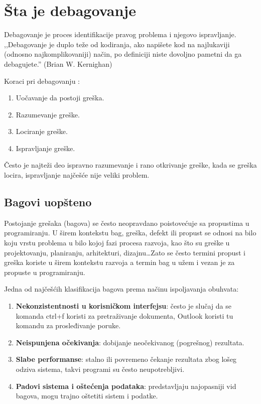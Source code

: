 \documentclass[a4paper]{article}
\begin{document}
\section{Šta je debagovanje}
\label{sec:sta je debagovanje}

Debagovanje je proces identifikacije pravog problema i njegovo ispravljanje.
,,Debagovanje je duplo teže od kodiranja, ako napišete kod na najlukaviji
(odnosno najkomplikovaniji) način, po definiciji niste dovoljno pametni da ga
debagujete.'' (Brian W. Kernighan) \cite{debagovanje_vladaf}


Koraci pri debagovanju \cite{bagovi_smalkov}:
\begin{enumerate}
\item Uočavanje da postoji greška.
\item Razumevanje greške.
\item Lociranje greške.
\item Ispravljanje greške.
\end{enumerate}

Često je najteži deo ispravno razumevanje i rano otkrivanje greške, kada se greška locira, ispravljanje najčešće nije veliki problem.


\subsection{Bagovi uopšteno}
\label{subsec:podnaslov1}

Postojanje grešaka (bagova) se često neopravdano poistovećuje sa propustima u programiranju.  U širem kontekstu bag, greška, defekt ili propust se odnosi na bilo koju vrstu problema u bilo kojoj fazi procesa razvoja, kao što su greške u projektovanju, planiranju, arhitekturi, dizajnu\ldots Zato se često termini propust i greška koriste u širem kontekstu razvoja a termin bag u užem i vezan je za propuste u programiranju.

Jedna od najčešćih klasifikacija bagova prema načinu ispoljavanja obuhvata:
\begin{enumerate}
	\item \textbf{Nekonzistentnosti u korisničkom interfejsu}: često je slučaj da se komanda ctrl+f koristi za pretraživanje dokumenta, Outlook koristi   
	tu komandu za prosleđivanje poruke.
	\item \textbf{Neispunjena očekivanja}: dobijanje neočekivanog (pogrešnog) rezultata.
	\item \textbf{Slabe performanse}: stalno ili povremeno čekanje rezultata zbog lošeg odziva sistema, takvi programi su često neupotrebljivi.
	\item \textbf{Padovi sistema i oštećenja podataka}: predstavljaju najopasniji vid bagova, mogu trajno oštetiti sistem i podatke.
\end{enumerate}
\end{document}
